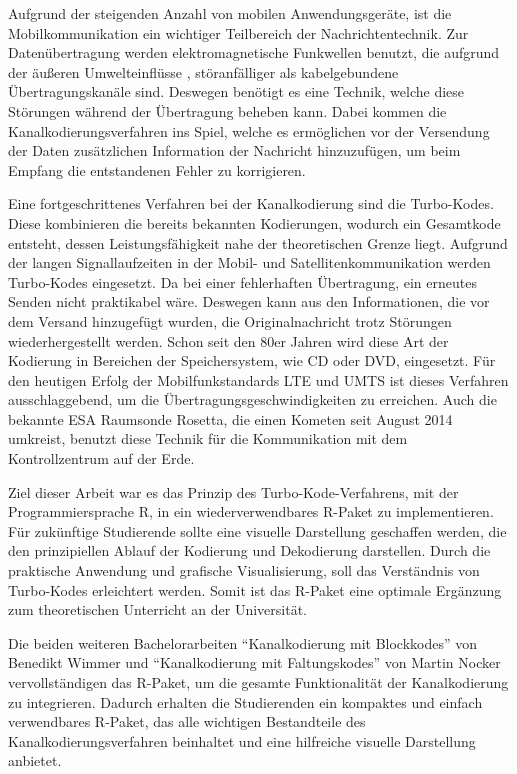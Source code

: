Aufgrund der steigenden Anzahl von mobilen Anwendungsgeräte, ist die Mobilkommunikation ein wichtiger Teilbereich der Nachrichtentechnik. Zur Datenübertragung werden elektromagnetische Funkwellen benutzt, die aufgrund der äußeren Umwelteinflüsse , störanfälliger als kabelgebundene Übertragungskanäle sind. Deswegen benötigt es eine Technik, welche diese Störungen während der Übertragung beheben kann. Dabei kommen die Kanalkodierungsverfahren ins Spiel, welche es ermöglichen vor der Versendung der Daten zusätzlichen Information der Nachricht hinzuzufügen, um beim Empfang die entstandenen Fehler zu korrigieren.

Eine fortgeschrittenes Verfahren bei der Kanalkodierung sind die Turbo-Kodes. Diese kombinieren die bereits bekannten Kodierungen, wodurch ein Gesamtkode entsteht, dessen Leistungsfähigkeit nahe der theoretischen Grenze liegt. Aufgrund der langen Signallaufzeiten in der Mobil- und Satellitenkommunikation werden Turbo-Kodes eingesetzt. Da bei einer fehlerhaften Übertragung, ein erneutes Senden nicht praktikabel wäre. Deswegen kann aus den Informationen, die vor dem Versand hinzugefügt wurden, die Originalnachricht trotz Störungen wiederhergestellt werden. Schon seit den 80er Jahren wird diese Art der Kodierung in Bereichen der Speichersystem, wie CD oder DVD, eingesetzt. Für den heutigen Erfolg der Mobilfunkstandards LTE und UMTS ist dieses Verfahren ausschlaggebend, um die Übertragungsgeschwindigkeiten zu erreichen. Auch die bekannte ESA Raumsonde Rosetta, die einen Kometen seit August 2014 umkreist, benutzt diese Technik für die Kommunikation mit dem Kontrollzentrum auf der Erde.~\cite[S.~242~f.]{schoenfeld2012informations} 

Ziel dieser Arbeit war es das Prinzip des Turbo-Kode-Verfahrens, mit der Programmiersprache R, in ein wiederverwendbares R-Paket zu implementieren. Für zukünftige Studierende sollte eine visuelle Darstellung geschaffen werden, die den prinzipiellen Ablauf der Kodierung und Dekodierung darstellen. Durch die praktische Anwendung und grafische Visualisierung, soll das Verständnis von Turbo-Kodes erleichtert werden. Somit ist das R-Paket eine optimale Ergänzung zum theoretischen Unterricht an der Universität.

Die beiden weiteren Bachelorarbeiten \enquote{Kanalkodierung mit Blockkodes} von Benedikt Wimmer \cite{wimmer} und \enquote{Kanalkodierung mit Faltungskodes} von Martin Nocker \cite{nocker} vervollständigen das R-Paket, um die gesamte Funktionalität der Kanalkodierung zu integrieren. Dadurch erhalten die Studierenden ein kompaktes und einfach verwendbares R-Paket, das alle wichtigen Bestandteile des Kanalkodierungsverfahren beinhaltet und eine hilfreiche visuelle Darstellung anbietet.   